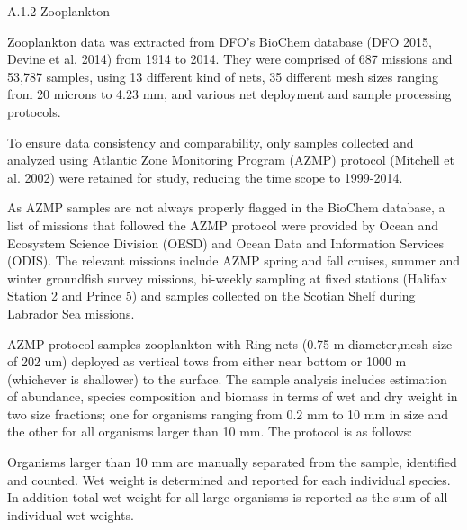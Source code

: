 \documentclass[letterpaper,portrait,12pt]{scrartcl}
\numberwithin{equation}{section}		%
\numberwithin{figure}{section}			%
\numberwithin{table}{section}				%
\begin{document}
A.1.2 Zooplankton









Zooplankton data was extracted from DFO's BioChem database (DFO 2015, Devine et al. 2014) from 1914 to 2014. They were comprised of 687 missions and 53,787 samples, using 13 different kind of nets, 35 different mesh sizes ranging from 20 microns to 4.23 mm, and various net deployment and sample processing protocols.









To ensure data consistency and comparability, only samples collected and analyzed using Atlantic Zone Monitoring Program (AZMP) protocol (Mitchell et al. 2002) were retained for study, reducing the time scope to 1999-2014. 









As AZMP samples are not always properly flagged in the BioChem database, a list of missions that followed the AZMP protocol were provided by Ocean and Ecosystem Science Division (OESD) and Ocean Data and Information Services (ODIS). The relevant missions include AZMP spring and fall cruises, summer and winter groundfish survey missions, bi-weekly sampling at fixed stations (Halifax Station 2 and Prince 5) and samples collected on the Scotian Shelf during Labrador Sea missions. 









AZMP protocol samples zooplankton with Ring nets (0.75 m diameter,mesh size of 202 um) deployed as vertical tows from either near bottom or 1000 m (whichever is shallower) to the surface. The sample analysis includes estimation of abundance, species composition and biomass in terms of wet and dry weight in two size fractions; one for organisms ranging from 0.2 mm to 10 mm in size and the other for all organisms larger than 10 mm.  The protocol is as follows:








\begin{flushleft}

	Organisms larger than 10 mm are manually separated from the sample, identified and counted. Wet weight is determined and reported for each individual species. In addition total wet weight for all large organisms is reported as the sum of all individual wet weights.

\end{flushleft}
\end{document}
